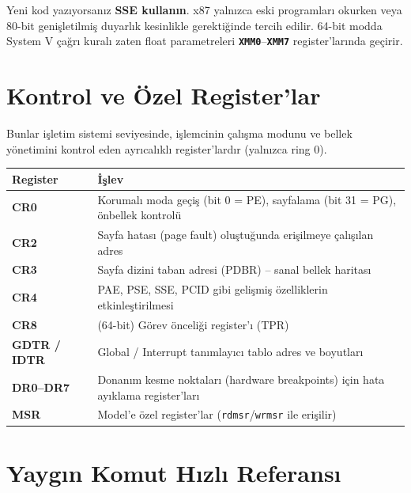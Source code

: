 \documentclass[11pt,a4paper]{article}
\newcommand{\reg}[1]{\texttt{\color{anaMavi}\textbf{#1}}}
\newcommand{\kod}[1]{\texttt{\color{koyuGri}#1}}
\begin{document}
\begin{ipucukutu}
Yeni kod yazıyorsanız \textbf{SSE kullanın}. x87 yalnızca eski programları
okurken veya 80-bit genişletilmiş duyarlık kesinlikle gerektiğinde tercih
edilir. 64-bit modda System V çağrı kuralı zaten float parametreleri
\reg{XMM0}--\reg{XMM7} register'larında geçirir.
\end{ipucukutu}

\section{Kontrol ve Özel Register'lar}

Bunlar işletim sistemi seviyesinde, işlemcinin çalışma modunu ve bellek
yönetimini kontrol eden ayrıcalıklı register'lardır (yalnızca ring 0).

\begin{center}
\begin{tabularx}{\textwidth}{@{}>{\bfseries\color{anaMavi}}l >{\raggedright\arraybackslash}X@{}}
\toprule
\rowcolor{acikMavi}\color{anaMavi}\textbf{Register} & \color{anaMavi}\textbf{İşlev} \\
\midrule
CR0 & Korumalı moda geçiş (bit 0 = PE), sayfalama (bit 31 = PG), önbellek kontrolü \\
\rowcolor{acikGri} CR2 & Sayfa hatası (page fault) oluştuğunda erişilmeye çalışılan adres \\
CR3 & Sayfa dizini taban adresi (PDBR) -- sanal bellek haritası \\
\rowcolor{acikGri} CR4 & PAE, PSE, SSE, PCID gibi gelişmiş özelliklerin etkinleştirilmesi \\
CR8 & (64-bit) Görev önceliği register'ı (TPR) \\
\rowcolor{acikGri} GDTR / IDTR & Global / Interrupt tanımlayıcı tablo adres ve boyutları \\
DR0--DR7 & Donanım kesme noktaları (hardware breakpoints) için hata ayıklama register'ları \\
MSR & Model'e özel register'lar (\kod{rdmsr}/\kod{wrmsr} ile erişilir) \\
\bottomrule
\end{tabularx}
\end{center}

\section{Yaygın Komut Hızlı Referansı}
\end{document}
